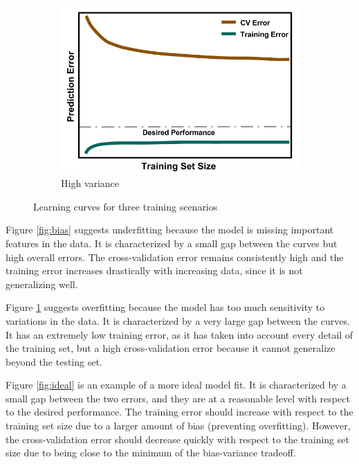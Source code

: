 \begin{figure}[!hp]
\begin{subfigure}[h]{0.65\linewidth}
    \includegraphics[width=\linewidth]{./chapters/litrev/LearningCurve-variance.png}
    \caption{High variance}
    \label{fig:variance}
  \end{subfigure}
  \caption{Learning curves for three training scenarios}
  \label{fig:learning}
\end{figure}

Figure \ref{fig:bias} suggests underfitting because the model is missing
important features in the data. It is characterized by a small gap between the
curves but high overall errors. The cross-validation error remains consistently
high and the training error increases drastically with increasing data, since
it is not generalizing well. 

Figure \ref{fig:variance} suggests overfitting because the model has too much
sensitivity to variations in the data. It is characterized by a very large gap
between the curves. It has an extremely low training error, as it has taken
into account every detail of the training set, but a high cross-validation
error because it cannot generalize beyond the testing set. 

Figure \ref{fig:ideal} is an example of a more ideal model fit. It is
characterized by a small gap between the two errors, and they are at a
reasonable level with respect to the desired performance.  The training error
should increase with respect to the training set size due to a larger amount of
bias (preventing overfitting). However, the cross-validation error should decrease
quickly with respect to the training set size due to being close to the minimum
of the bias-variance tradeoff. 


